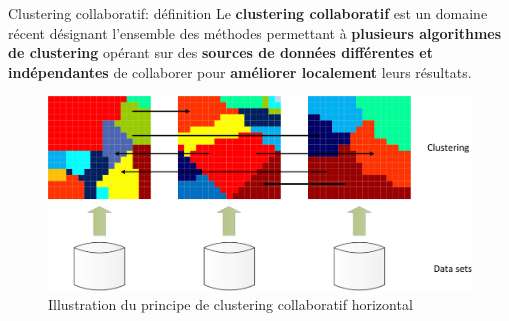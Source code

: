 \documentclass[hyperref={pdfpagelabels=false}]{beamer}
\begin{document}

    \begin{frame}{Clustering collaboratif: définition}
        Le \textbf{clustering collaboratif} est un domaine récent désignant 
        l'ensemble des méthodes permettant à \textbf{plusieurs algorithmes de 
        clustering} opérant sur des \textbf{sources de données différentes et 
        indépendantes} de collaborer pour \textbf{améliorer localement} leurs 
        résultats.

        \begin{figure}[b]
            \centering
            \includegraphics[scale=0.02]{hcc-min}
            \caption{Illustration du principe de clustering collaboratif 
            horizontal}
        \end{figure}
    \end{frame}
\end{document}
